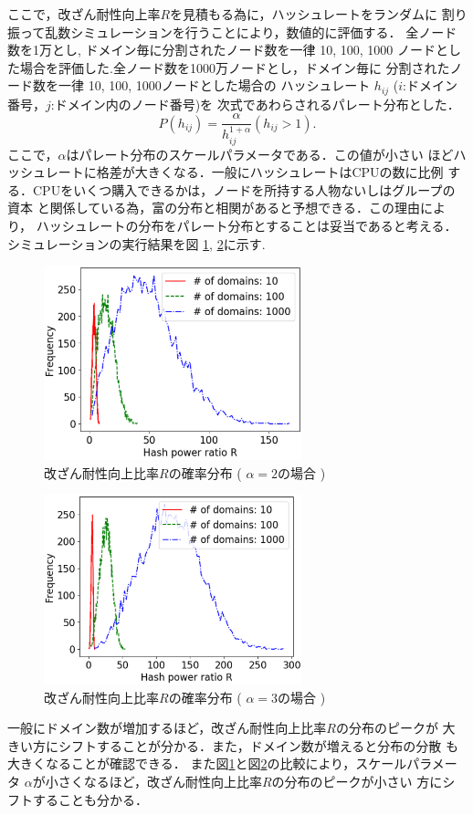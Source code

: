 \documentclass[a4paper,12pt]{jsarticle}
\begin{document}
ここで，改ざん耐性向上率$R$を見積もる為に，ハッシュレートをランダムに
割り振って乱数シミュレーションを行うことにより，数値的に評価する．
全ノード数を1万とし, ドメイン毎に分割されたノード数を一律 10, 100, 1000
ノードとした場合を評価した.全ノード数を1000万ノードとし，ドメイン毎に
分割されたノード数を一律 10, 100, 1000ノードとした場合の
ハッシュレート $ h_{ij} $ ($i$:ドメイン番号，$j$:ドメイン内のノード番号)を
次式であわらされるパレート分布とした．
%
\begin{equation}
	P(h_{ij}) = \frac{\alpha}{h_{ij}^{1+\alpha}} (h_{ij} > 1).
\end{equation}
%
ここで，$\alpha$はパレート分布のスケールパラメータである．この値が小さい
ほどハッシュレートに格差が大きくなる．一般にハッシュレートはCPUの数に比例
する．CPUをいくつ購入できるかは，ノードを所持する人物ないしはグループの資本
と関係している為，富の分布と相関があると予想できる．この理由により，
ハッシュレートの分布をパレート分布とすることは妥当であると考える．
シミュレーションの実行結果を図 \ref{fig:alpha2}, \ref{fig:alpha3}に示す. 
%
\begin{figure}[tb]
  \begin{center}
    \includegraphics[width=75mm]{pht/hist-comp-R-alpha2.0-m1.0.eps}
  \end{center}
  \caption{改ざん耐性向上比率$R$の確率分布 ( $\alpha=2$の場合 ) }
  \label{fig:alpha2}
\end{figure}
%
%
\begin{figure}[tb]
  \begin{center}
    \includegraphics[width=75mm]{pht/hist-comp-R-alpha3.0-m1.0.eps}
  \end{center}
  \caption{改ざん耐性向上比率$R$の確率分布 ( $\alpha=3$の場合 ) }
  \label{fig:alpha3}
\end{figure}
%
一般にドメイン数が増加するほど，改ざん耐性向上比率$R$の分布のピークが
大きい方にシフトすることが分かる．また，ドメイン数が増えると分布の分散
も大きくなることが確認できる．
また図\ref{fig:alpha2}と図\ref{fig:alpha3}の比較により，スケールパラメータ
$\alpha$が小さくなるほど，改ざん耐性向上比率$R$の分布のピークが小さい
方にシフトすることも分かる．
\end{document}
